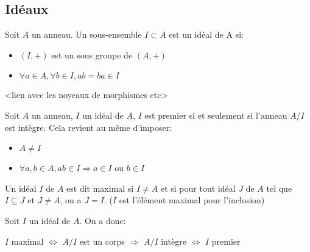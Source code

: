 \subsection{Idéaux}

\begin{definition}
    Soit $A$ un anneau. Un sous-ensemble $I \subset A$ est un idéal de A si:
    \begin{itemize}
        \item $(I, +)$ est un sous groupe de $(A, +)$
        \item $\forall a \in A, \forall b \in I, ab = ba \in I$
    \end{itemize}
\end{definition}

<lien avec les noyeaux de morphismes etc>

\begin{definition}
    Soit $A$ un anneau, $I$ un idéal de $A$, $I$ est premier si et seulement si l'anneau $A/I$ est intègre.
    Cela revient au même d'imposer:
    \begin{itemize}
        \item $A \neq I$
        \item $\forall a, b \in A, ab \in I \Longrightarrow a \in I$ ou $ b \in I$
    \end{itemize}
\end{definition}

\begin{definition}
    Un idéal $I$ de $A$ est dit maximal si $I \neq A$ et si pour tout idéal $J$ de $A$ tel que $I \subseteq J$ et $J \neq A$, on a $J = I$.
    ($I$ est l'élément maximal pour l'inclusion)
\end{definition}

\begin{proposition}
    Soit $I$ un idéal de $A$. On a donc:
    \begin{center}
        $I$ maximal $\Longleftrightarrow$ $A/I$ est un corps $\Longrightarrow$ $A/I$ intègre $\Longleftrightarrow$ $I$ premier
    \end{center}
\end{proposition}
